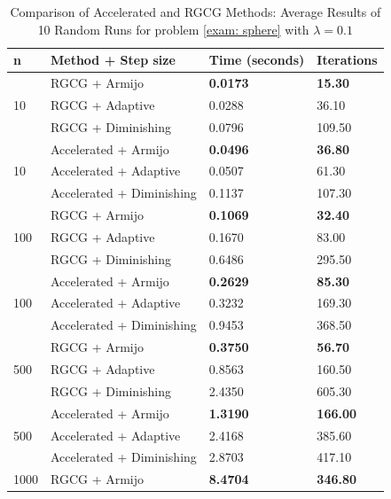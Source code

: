 \documentclass[pdflatex,sn-mathphys-num]{sn-jnl}%
\theoremstyle{definition} %
\theoremstyle{remark} %
\begin{document}
\begin{table}[htbp]
    \centering
    \caption{Comparison of Accelerated and RGCG Methods: Average Results of 10 Random Runs for problem \eqref{exam: sphere} with \( \lambda = 0.1 \)}
    \begin{tabular}{l p{4.5cm} p{2.5cm} p{2.5cm}}
        \toprule
          n & Method + Step size & Time (seconds) & Iterations \\
        \midrule
        \multirow{3}{*}{10} 
          & RGCG + Armijo & \textbf{0.0173} & \textbf{15.30} \\
          & RGCG + Adaptive & 0.0288 & 36.10 \\
          & RGCG + Diminishing & 0.0796 & 109.50 \\
        \midrule
        \multirow{3}{*}{10} 
          & Accelerated + Armijo & \textbf{0.0496} & \textbf{36.80} \\
          & Accelerated + Adaptive & 0.0507 & 61.30 \\
          & Accelerated + Diminishing & 0.1137 & 107.30 \\
        \midrule
        \multirow{3}{*}{100} 
          & RGCG + Armijo & \textbf{0.1069} & \textbf{32.40} \\
          & RGCG + Adaptive & 0.1670 & 83.00 \\
          & RGCG + Diminishing & 0.6486 & 295.50 \\
        \midrule
        \multirow{3}{*}{100} 
          & Accelerated + Armijo & \textbf{0.2629} & \textbf{85.30} \\
          & Accelerated + Adaptive & 0.3232 & 169.30 \\
          & Accelerated + Diminishing & 0.9453 & 368.50 \\
        \midrule
        \multirow{3}{*}{500} 
          & RGCG + Armijo & \textbf{0.3750} & \textbf{56.70} \\
          & RGCG + Adaptive & 0.8563 & 160.50 \\
          & RGCG + Diminishing & 2.4350 & 605.30 \\
        \midrule
        \multirow{3}{*}{500} 
          & Accelerated + Armijo & \textbf{1.3190} & \textbf{166.00} \\
          & Accelerated + Adaptive & 2.4168 & 385.60 \\
          & Accelerated + Diminishing & 2.8703 & 417.10 \\
        \midrule
        \multirow{3}{*}{1000} 
          & RGCG + Armijo & \textbf{8.4704} & \textbf{346.80} \\

\end{tabular}
\end{table}
\end{document}
